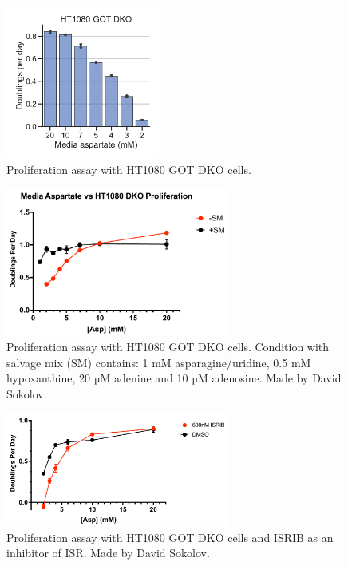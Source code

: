 \begin{figure}[ht]
    \centering
    \includegraphics[width=0.45\textwidth]{figures/sapp/tRNA/HT1080_DKO_asp-titr.pdf}
    \caption[Asp titration in H1080 GOT DKO]{
    Proliferation assay with HT1080 GOT DKO cells.
    }
    \label{fig:sapp:tRNA:HT1080_DKO_prlfr1}
\end{figure}

\begin{figure}[ht]
    \centering
    \includegraphics[width=0.65\textwidth]{figures/sapp/tRNA/HT1080_GOT-DKO_prlfr.pdf}
    \caption[Asp titration in H1080 GOT DKO]{
    Proliferation assay with HT1080 GOT DKO cells.
    Condition with salvage mix (SM) contains: 1 mM asparagine/uridine, 0.5 mM hypoxanthine, 20 µM adenine and 10 µM adenosine.
    Made by David Sokolov.
    }
    \label{fig:sapp:tRNA:HT1080_DKO_prlfr2}
\end{figure}

\begin{figure}[ht]
    \centering
    \includegraphics[width=0.65\textwidth]{figures/sapp/ISR/ISRIB-Exp2.pdf}
    \caption[Effect of ISR inhibition on HT1080 GOT DKO]{
    Proliferation assay with HT1080 GOT DKO cells and ISRIB as an inhibitor of ISR.
    Made by David Sokolov.
    }
    \label{fig:sapp:ISR:HT1080_DKO_ISRIB}
\end{figure}





